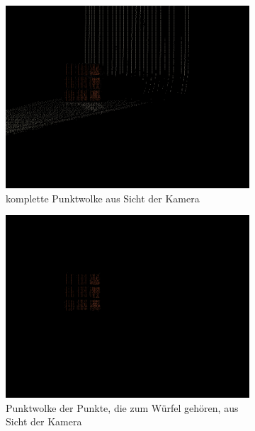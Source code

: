 \documentclass[ngerman,a4paper,parskip=half]{scrartcl}
\begin{document}
\begin{figure}[H]
	\centering
	\begin{subfigure}{0.45\textwidth}
		\includegraphics[width=\textwidth]{includes/diff_orange_300_cam.png}
		\caption{komplette Punktwolke aus Sicht der Kamera}
	\end{subfigure}
	\hfill
	\begin{subfigure}{0.45\textwidth}
		\includegraphics[width=\textwidth]{includes/diff_only_orange_300_cam.png}
		\caption{Punktwolke der Punkte, die zum Würfel gehören, aus Sicht der Kamera}
	\end{subfigure}
	\begin{subfigure}{0.45\textwidth}

\end{subfigure}
\end{figure}
\end{document}
